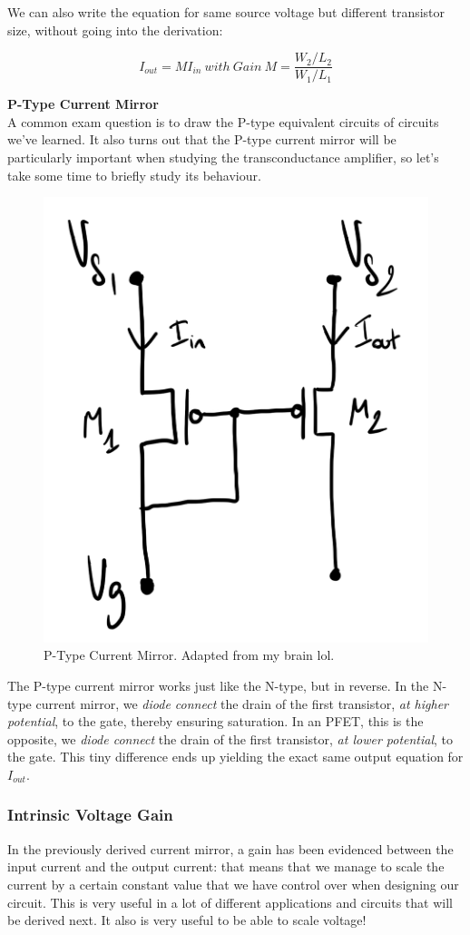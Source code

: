 We can also write the equation for same source voltage but different transistor size, without going into the derivation: 

\begin{equation}
I_{out} = M I_{in} \ with \ Gain \ M = \frac{W_2/L_2}{W_1/L_1}
\end{equation}

\newline \newline
\textbf{P-Type Current Mirror} \\

A common exam question is to draw the P-type equivalent circuits of circuits we've learned. It also turns out that the P-type current mirror will be particularly important when studying the transconductance amplifier, so let's take some time to briefly study its behaviour.   

\begin{figure}[H]
    \centering
    \includegraphics[width=0.3\linewidth]{../../Figures/Ptype_Current_Mirror.jpg}
    \caption{P-Type Current Mirror. Adapted from my brain lol.}
    \label{fig:N-Type Current Mirror}
\end{figure}

The P-type current mirror works just like the N-type, but in reverse. In the N-type current mirror, we \textit{diode connect} the drain of the first transistor, \textit{at higher potential}, to the gate, thereby ensuring saturation. In an PFET, this is the opposite, we \textit{diode connect} the drain of the first transistor, \textit{at lower potential}, to the gate. This tiny difference ends up yielding the exact same output equation for $I_{out}$. 

\subsubsection{Intrinsic Voltage Gain}

In the previously derived current mirror, a gain has been evidenced between the input current and the output current: that means that we manage to scale the current by a certain constant value that we have control over when designing our circuit. This is very useful in a lot of different applications and circuits that will be derived next. It also is very useful to be able to scale voltage!

